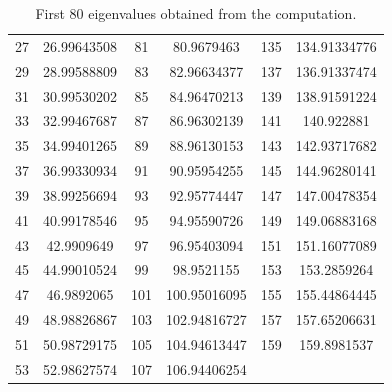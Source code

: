 \documentclass[11pt,a4paper]{article}
\begin{document}
\begin{table}
\begin{center}
\begin{tabular}{cc|cc|cc}
			       27         &    26.99643508    &        81         &    80.9679463     &        135        &    134.91334776    \\
			       29         &    28.99588809    &        83         &    82.96634377    &        137        &    136.91337474    \\
			       31         &    30.99530202    &        85         &    84.96470213    &        139        &    138.91591224    \\
			       33         &    32.99467687    &        87         &    86.96302139    &        141        &     140.922881     \\
			       35         &    34.99401265    &        89         &    88.96130153    &        143        &    142.93717682    \\
			       37         &    36.99330934    &        91         &    90.95954255    &        145        &    144.96280141    \\
			       39         &    38.99256694    &        93         &    92.95774447    &        147        &    147.00478354    \\
			       41         &    40.99178546    &        95         &    94.95590726    &        149        &    149.06883168    \\
			       43         &    42.9909649     &        97         &    96.95403094    &        151        &    151.16077089    \\
			       45         &    44.99010524    &        99         &    98.9521155     &        153        &    153.2859264     \\
			       47         &    46.9892065     &        101        &   100.95016095    &        155        &    155.44864445    \\
			       49         &    48.98826867    &        103        &   102.94816727    &        157        &    157.65206631    \\
			       51         &    50.98729175    &        105        &   104.94613447    &        159        &    159.8981537     \\
			       53         &    52.98627574    &        107        &   106.94406254    &                   &                    \\ \hline
		\end{tabular}
	\end{center}
	\caption{First 80 eigenvalues obtained from the computation.}
	\label{tab:eigvals}
\end{table} 
\end{document}
